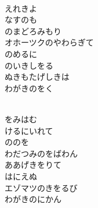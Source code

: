 \documentclass[10pt,b5j]{tarticle} %
\begin{document}
\vspace{1.5em} %
\newcommand{\linespace}{0.5em} %
\newcommand{\blocksize}{0.5\hsize} %
\newcommand{\itemmargin}{6em} %
\begin{enumerate} %
    \setlength{\itemindent}{\itemmargin} %
    \begin{minipage}[c]{\blocksize}
    
        \vspace{\linespace}
        \item~\\
        えれきよ\\
        なすのも\\
        のまどろみもり\\
        オホーツクのやわらぎて\\
        のめるに\\
        のいきしをる\\
        ぬきもたげしきは\\
        わがきのをく
        
        \vspace{\linespace}
        \item~\\
        をみはむ\\
        けるにいれて\\
        ののを\\
        わだつみのをばわん\\
        ああげきをりて\\
        はにえぬ\\
        エゾマツのきをるび\\
        わがきのにかん
        

\end{minipage}
\end{enumerate}
\end{document}
